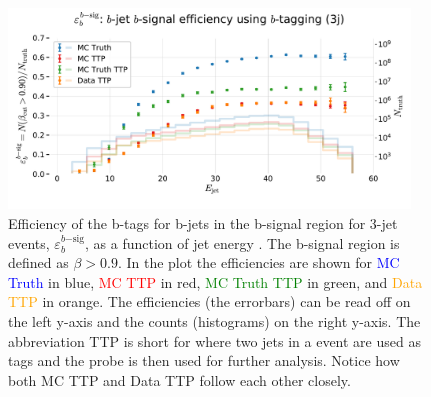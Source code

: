 \newpage



\begin{figure}
  \centerfloat
  \includegraphics[width=0.95\textwidth, trim=0 0 0 40, clip]{figures/quarks/eff_b_bsig-down_sample=1.00-ML_vars=vertex-selection=b-ejet_min=4-n_iter_RS_lgb=99-n_iter_RS_xgb=9-cdot_cut=0.90-version=19.pdf}
  \caption[b-Tagging Efficiency $\varepsilon_b^{b\mathrm{-sig}}$ as a function of jet energy]
          {Efficiency of the b-tags for b-jets in the b-signal region for 3-jet events, $\varepsilon_b^{b\mathrm{-sig}}$, as a function of jet energy . The b-signal region is defined as $\beta > 0.9$. In the plot the efficiencies are shown for \textcolor{blue}{MC Truth} in blue, \textcolor{red}{MC TTP} in red, \textcolor{green}{MC Truth TTP} in green, and \textcolor{orange}{Data TTP} in orange. The efficiencies (the errorbars) can be read off on the left y-axis and the counts (histograms) on the right y-axis. The abbreviation TTP is short for  where two jets in a event are used as tags and the probe is then used for further analysis. Notice how both MC TTP and Data TTP follow each other closely.  
          } 
  \label{fig:q:effiency_btag_bjet_bsig}
\end{figure}


